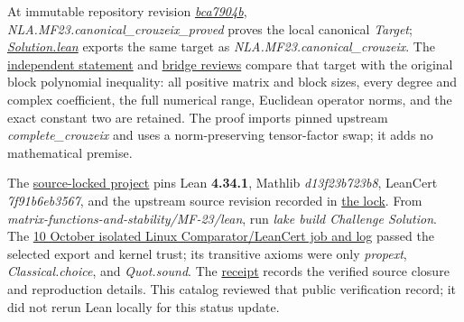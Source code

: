 \documentclass[11pt,a4paper]{article}
\makeatletter
\renewcommand{\subsection}{\Needspace{4\baselineskip}\@startsection{subsection}{2}{0pt}{9pt plus 1pt minus 1pt}{3pt}{\sffamily\bfseries\normalsize\color{ink}}}
\makeatother
\begin{document}
At immutable repository revision
\href{https://github.com/ajt60gaibb/OpenProblemsInNLA/blob/bca7904b8d6f43b7258bc0eaed636a2b6b4a8792/matrix-functions-and-stability/MF-23/lean/CanonicalBridge.lean}{\textit{bca7904b}},
\textit{NLA.MF23.canonical\_crouzeix\_proved} proves the local canonical
\textit{Target};
\href{https://github.com/ajt60gaibb/OpenProblemsInNLA/blob/main/matrix-functions-and-stability/MF-23/lean/Solution.lean}{\textit{Solution.lean}}
exports the same target as \textit{NLA.MF23.canonical\_crouzeix}. The
\href{https://github.com/ajt60gaibb/OpenProblemsInNLA/blob/main/docs/lean/proofs/MF-23/CANONICAL_STATEMENT_INDEPENDENT_REVIEW.md}{independent
statement} and
\href{https://github.com/ajt60gaibb/OpenProblemsInNLA/blob/main/docs/lean/proofs/MF-23/CANONICAL_BRIDGE_INDEPENDENT_REVIEW.md}{bridge
reviews} compare that target with the original block polynomial
inequality: all positive matrix and block sizes, every degree and
complex coefficient, the full numerical range, Euclidean operator norms,
and the exact constant two are retained. The proof imports pinned
upstream \textit{complete\_crouzeix} and uses a norm-preserving
tensor-factor swap; it adds no mathematical premise.

The
\href{https://github.com/ajt60gaibb/OpenProblemsInNLA/blob/main/matrix-functions-and-stability/MF-23/lean/lake-manifest.json}{source-locked
project} pins Lean \textbf{4.34.1}, Mathlib \textit{d13f23b723b8},
LeanCert \textit{7f91b6eb3567}, and the upstream source revision
recorded in
\href{https://github.com/ajt60gaibb/OpenProblemsInNLA/blob/main/matrix-functions-and-stability/MF-23/lean/upstream-source-lock.json}{the
lock}. From \textit{matrix-functions-and-stability/MF-23/lean}, run
\textit{lake build Challenge Solution}. The
\href{https://github.com/ajt60gaibb/OpenProblemsInNLA/actions/runs/38006337671/job/114076127209}{10
October isolated Linux Comparator/LeanCert job and log} passed the
selected export and kernel trust; its transitive axioms were only
\textit{propext}, \textit{Classical.choice}, and \textit{Quot.sound}.
The
\href{https://github.com/ajt60gaibb/OpenProblemsInNLA/blob/main/docs/lean/proofs/MF-23/LINUX_CI_RECEIPT.md}{receipt}
records the verified source closure and reproduction details. This
catalog reviewed that public verification record; it did not rerun Lean
locally for this status update.

\newpage

\subsection{Context and notation}\label{context-and-notation}
\end{document}
